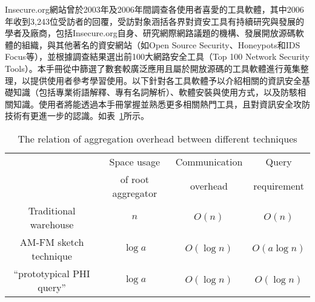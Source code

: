 Insecure.org網站曾於2003年及2006年間調查各使用者喜愛的工具軟體，其中2006年收到3,243位受訪者的回覆，受訪對象涵括各界對資安工具有持續研究與發展的學者及廠商，包括Insecure.org自身、研究網際網路議題的機構、發展開放源碼軟體的組織，與其他著名的資安網站（如Open Source Security、Honeypots和IDS Focus等），並根據調查結果選出前100大網路安全工具（Top 100 Network Security Tools）。本手冊從中篩選了數套較廣泛應用且屬於開放源碼的工具軟體進行蒐集整理，以提供使用者參考學習使用。以下針對各工具軟體予以介紹相關的資訊安全基礎知識（包括專業術語解釋、專有名詞解析）、軟體安裝與使用方式，以及防駭相關知識。使用者將能透過本手冊掌握並熟悉更多相關熱門工具，且對資訊安全攻防技術有更進一步的認識。如表~\ref{tab:system}所示。 

\begin{table}[H]
  \begin{center}
    \caption{The relation of aggregation overhead between different techniques}
    \label{tab:system}
    \begin{tabular}{|c|c c c|}
      \hline
       & Space usage & Communication & Query \\
       & of root aggregator & overhead & requirement \\
      \hline
      Traditional warehouse & $n$ & $O(n)$ & $O(n)$ \\
      \hline
      AM-FM sketch technique & $\log a$ & $O(\log n)$ &  $O(a\log n)$ \\
      \hline
      ``prototypical PHI query'' & $\log a$ & $O(\log n)$ & $O(\log n)$ \\
      \hline
      \end{tabular}
  \end{center}
\end{table}


